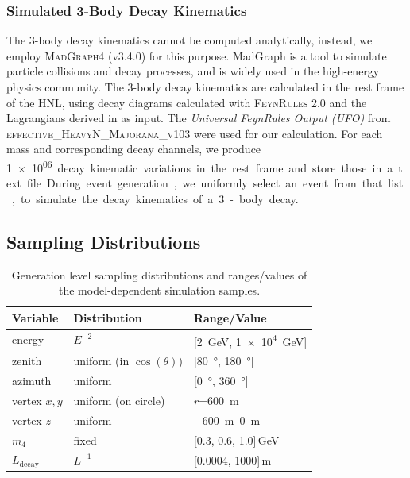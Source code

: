 \subsubsection{Simulated 3-Body Decay Kinematics}

The 3-body decay kinematics cannot be computed analytically, instead, we employ \textsc{MadGraph4} (v3.4.0) \cite{madgraph4} for this purpose. MadGraph is a tool to simulate particle collisions and decay processes, and is widely used in the high-energy physics community. The 3-body decay kinematics are calculated in the rest frame of the HNL, using decay diagrams calculated with \textsc{FeynRules 2.0}  and the Lagrangians derived in  as input. The \textit{Universal FeynRules Output (UFO)} from \textsc{effective\_HeavyN\_Majorana\_v103} were used for our calculation. For each mass and corresponding decay channels, we produce \SI{1e06} decay kinematic variations in the rest frame and store those in a text file. During event generation, we uniformly select an event from that list, to simulate the decay kinematics of a 3-body decay.


\subsection{Sampling Distributions} 

\begin{table}[H]
    \centering
    \begin{tabular} { lll }
        \hline \hline 
        \textbf{Variable} & \textbf{Distribution} & \textbf{Range/Value} \\
        \hline \hline 
        energy & $E^{-2}$ & [\SI{2}{\GeV}, \SI{1e4}{\GeV}] \\
        zenith & uniform (in $\cos(\theta)$) & [\SI{80}{\degree}, \SI{180}{\degree}] \\
        azimuth & uniform & [\SI{0}{\degree}, \SI{360}{\degree}] \\
        vertex $x,y$ & uniform (on circle) & $r$=\SI{600}{\metre} \\
        vertex $z$ & uniform & \SIrange{-600}{0}{\metre} \\
        $m_\mathrm{4}$ & fixed & [0.3, 0.6, 1.0]\,\si{\GeV} \\
        $L_\mathrm{decay}$ & $L^{-1}$ & [0.0004, 1000]\,\si{\metre} \\
        \hline
    \end{tabular}
    \caption[Model-dependent simulation sampling distributions]{Generation level sampling distributions and ranges/values of the model-dependent simulation samples.}
\end{table}

